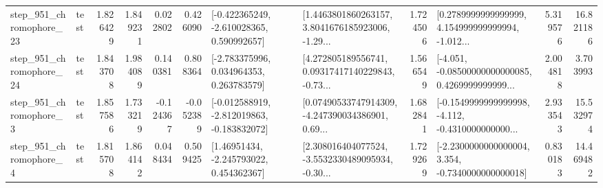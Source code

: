 \begin{tabular}{llrrrrllrlrr}
  step\_951\_chromophore\_23 &      test &      1.826429 &    1.849231 &      0.022802 &  0.426090 &   [-0.422365249, -2.610028365, 0.590992657] &  [1.4463801860263157, 3.8041676185923006, -1.29... &       1.724506 &  [0.2789999999999999, 4.154999999999994, -1.012... &            5.319576 &         16.821186 \\
  step\_951\_chromophore\_24 &      test &      1.843708 &    1.984089 &      0.140381 &  0.808364 &    [-2.783375996, 0.034964353, 0.263783579] &  [4.272805189556741, 0.09317417140229843, -0.73... &       1.566549 &  [-4.051, -0.08500000000000085, 0.4269999999999... &            2.004818 &          3.703993 \\
   step\_951\_chromophore\_3 &      test &      1.857586 &    1.733219 &     -0.124367 & -0.052389 &  [-0.012588919, -2.812019863, -0.183832072] &  [0.07490533747914309, -4.247390034386901, 0.69... &       1.682841 &  [-0.1549999999999998, -4.112, -0.4310000000000... &            2.933543 &         15.532974 \\
   step\_951\_chromophore\_4 &      test &      1.815708 &    1.864142 &      0.048434 &  0.509425 &     [1.46951434, -2.245793022, 0.454362367] &  [2.308016404077524, -3.5532330489095934, -0.30... &       1.729269 &  [-2.2300000000000004, 3.354, -0.7340000000000018] &            0.830183 &         14.469482 \\
\bottomrule
\end{tabular}

